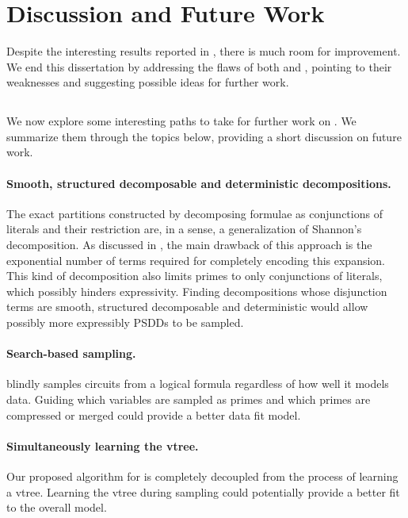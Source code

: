 \section{Discussion and Future Work}

Despite the interesting results reported in , there is much room for
improvement. We end this dissertation by addressing the flaws of both  and
, pointing to their weaknesses and suggesting possible ideas for further work.

\subsection{}

We now explore some interesting paths to take for further work on . We
summarize them through the topics below, providing a short discussion on future work.

\paragraph{Smooth, structured decomposable and deterministic decompositions.} The exact partitions
constructed by decomposing formulae as conjunctions of literals and their restriction are, in a
sense, a generalization of Shannon's decomposition. As discussed in , the main
drawback of this approach is the exponential number of terms required for completely encoding this
expansion. This kind of decomposition also limits primes to only conjunctions of literals, which
possibly hinders expressivity. Finding decompositions whose disjunction terms are smooth,
structured decomposable and deterministic would allow possibly more expressibly PSDDs to be
sampled.

\paragraph{Search-based sampling.}  blindly samples circuits from a logical
formula regardless of how well it models data. Guiding which variables are sampled as primes and
which primes are compressed or merged could provide a better data fit model.

\paragraph{Simultaneously learning the vtree.} Our proposed algorithm for  is
completely decoupled from the process of learning a vtree. Learning the vtree during sampling could
potentially provide a better fit to the overall model.

